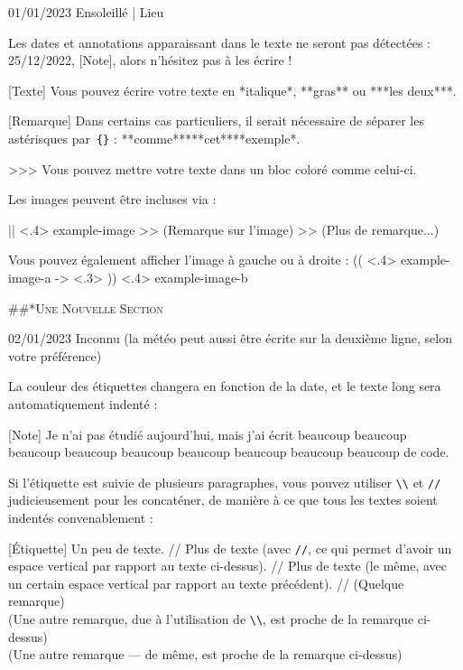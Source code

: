 \documentclass[11pt, paperstyle=light yellow, color entry, day-month-year,
  title in boldface, title in sffamily, use style = classical]{jwjournal}
\begin{document}
01/01/2023 Ensoleillé | Lieu

  Les dates et annotations apparaissant dans le texte ne seront pas  détectées : 25/12/2022, [Note], alors n'hésitez pas à les écrire !

  [Texte] Vous pouvez écrire votre texte en *italique*, **gras** ou ***les deux***.

  [Remarque] Dans certains cas particuliers, il serait nécessaire de séparer les astérisques par~\texttt{\{\}} : **comme**{}***cet***{}*exemple*.

  >>> Vous pouvez mettre votre texte dans un bloc coloré comme celui-ci.

  Les images peuvent être incluses via :

  || <.4> {example-image} %
  >> (Remarque sur l'image)
  >> (Plus de remarque...)

  Vous pouvez également afficher l'image à gauche ou à droite :
  (( <.4> {example-image-a} %
  -> <.3> %
  )) <.4> {example-image-b} %


##*{\textsc{Une Nouvelle Section}}

02/01/2023
Inconnu (la météo peut aussi être écrite sur la deuxième ligne, selon votre préférence)

  La couleur des étiquettes changera en fonction de la date, et le texte long sera automatiquement indenté :

  [Note] Je n'ai pas étudié aujourd'hui, mais j'ai écrit beaucoup beaucoup beaucoup beaucoup beaucoup beaucoup beaucoup beaucoup beaucoup de code.

  Si l'étiquette est suivie de plusieurs paragraphes, vous pouvez utiliser \texttt{\textbackslash\textbackslash} et \texttt{\slash\slash} judicieusement pour les concaténer, de manière à ce que tous les textes soient indentés convenablement :

  [Étiquette] Un peu de texte.
    //
    Plus de texte (avec \texttt{\slash\slash}, ce qui permet d'avoir un espace vertical par rapport au texte ci-dessus).
    //
    Plus de texte (le même, avec un certain espace vertical par rapport au texte précédent).
    //
    (Quelque remarque)
    \\
    (Une autre remarque, due à l'utilisation de \texttt{\textbackslash\textbackslash}, est proche de la remarque ci-dessus)
    \\
    (Une autre remarque --- de même, est proche de la remarque ci-dessus)
\end{document}

